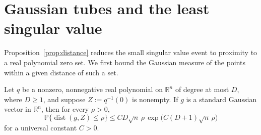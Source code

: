 \section{Gaussian tubes and the least singular value}
\label{sec:gaussian-tubes}

Proposition~\ref{prop:distance} reduces the small singular value event to proximity to a real polynomial zero set.
We first bound the Gaussian measure of the points within a given distance of such a set.

\begin{lemma}
\label{lem:gaussian-tube}
Let \(q\) be a nonzero, nonnegative real polynomial on \(\mathbb R^n\) of degree at most \(D\), where \(D\ge 1\), and suppose \(Z:=q^{-1}(0)\) is nonempty.
If \(g\) is a standard Gaussian vector in \(\mathbb R^n\), then for every \(\rho>0\),
\[
  \mathbb P\bigl\{\operatorname{dist}(g,Z)\le \rho\bigr\}
  \le C D\sqrt n\,\rho\,
      \exp\bigl(C(D+1)\sqrt n\,\rho\bigr)
\]
for a universal constant \(C>0\).
\end{lemma}

